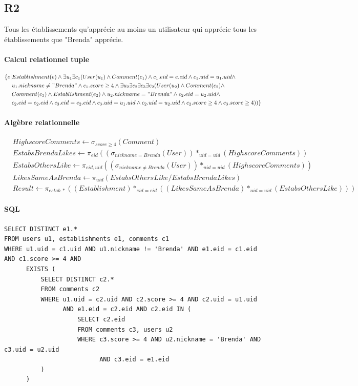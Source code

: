 \documentclass[11pt,a4paper]{report}
\begin{document}
\subsection*{R2}

\noindent Tous les établissements qu’apprécie au moins un utilisateur qui apprécie tous les établissements que "Brenda" apprécie.
\paragraph*{Calcul relationnel tuple}
\begin{align*}
\{e|& Establishment(e) \wedge \exists u_{1} \exists c_{1} (User(u_{1}) \wedge Comment(c_{1}) \wedge c_{1}.eid = e.eid \wedge c_{1}.uid=u_{1}.uid \wedge \\
& u_{1}.nickname \neq "Brenda" \wedge c_{1}.score \geq 4 \wedge  \exists u_{2} \exists c_{2} \exists c_{3} \exists e_{2} ( User(u_{2}) \wedge Comment(c_{2})\wedge \\
& Comment(c_{3}) \wedge Establishment(e_{2}) \wedge u_{2}.nickname = "Brenda" \wedge c_{2}.eid = u_{2}.uid \wedge \\
& c_{2}.eid = e_{2}.eid \wedge  c_{3}.eid = e_{2}.eid \wedge  c_{3}.uid = u_{1}.uid \wedge  c_{2}.uid = u_{2}.uid \wedge c_{2}.score \geq 4 \wedge c_{3}.score \geq 4
))
\}
\end{align*}
\paragraph*{Algèbre relationnelle}
\begin{align*}
& HighscoreComments \leftarrow \sigma_{score \ge 4} (Comment) \\
& EstabsBrendaLikes \leftarrow \pi_{eid} ( (\sigma_{nickname=Brenda} (User)) *_{uid=uid} (HighscoreComments) ) \\
& EstabsOthersLike \leftarrow \pi_{eid, uid} ( (\sigma_{nickname \neq Brenda} (User)) *_{uid=uid} (HighscoreComments) ) \\
& LikesSameAsBrenda \leftarrow \pi_{uid} (EstabsOthersLike / EstabsBrendaLikes) \\
& Result \leftarrow \pi_{estab.*} ((Establishment) *_{eid=eid} ((LikesSameAsBrenda) *_{uid=uid} (EstabsOthersLike)))
\end{align*}
\paragraph*{SQL}
\begin{verbatim}
SELECT DISTINCT e1.*
FROM users u1, establishments e1, comments c1
WHERE u1.uid = c1.uid AND u1.nickname != 'Brenda' AND e1.eid = c1.eid AND c1.score >= 4 AND 
      EXISTS (
          SELECT DISTINCT c2.*
          FROM comments c2 
          WHERE u1.uid = c2.uid AND c2.score >= 4 AND c2.uid = u1.uid 
          		AND e1.eid = c2.eid AND c2.eid IN (
              		SELECT c2.eid
              		FROM comments c3, users u2
              		WHERE c3.score >= 4 AND u2.nickname = 'Brenda' AND c3.uid = u2.uid 
                    	  AND c3.eid = e1.eid
          )
      )
\end{verbatim}
\end{document}

